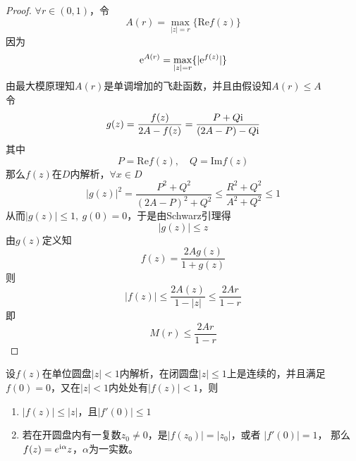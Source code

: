 \begin{proof}
    
    $\forall r \in (0,1)$，令
    $$A(r) = \max_{|z|=r}\{\mathrm{Re}f(z)\}$$
    因为
    $$\mathrm{e}^{A(r)} = \max_{|z|=r}\{|\mathrm{e}^{f(z)}|\}$$
    由最大模原理知$A(r)$是单调增加的飞赴函数，并且由假设知$A(r) \leq A$\\
    令
    $$ g(z) = \dfrac{f(z)}{2A - f(z)} = \dfrac{P + Q\mathrm{i}}{(2A-P)-Q\mathrm{i}} $$
    其中
    $$ P = \mathrm{Re}f(z),\quad Q = \mathrm{Im}f(z) $$
    那么$f(z)$在$D$内解析，$\forall x\in D$
    $$|g(z)|^2 = \dfrac{P^2 + Q^2}{(2A-P)^2 + Q^2} \leq \dfrac{R^2 + Q^2}{A^2 + Q^2} \leq 1$$
    从而$|g(z)| \leq 1,\ g(0) = 0$，于是由\textup{Schwarz}引理得
    $$|g(z) | \leq z$$
    由$g(z)$定义知
    $$f(z) = \dfrac{2Ag(z)}{1 + g(z)}$$
    则
    $$ |f(z)| \leq \dfrac{2A(z)}{1 - |z|} \leq \dfrac{2Ar}{1 - r}$$
    即
    $$M(r) \leq \dfrac{2Ar}{1 - r}$$

\end{proof}

\begin{lemma}[Schwarz引理]
    
    设$f(z)$在单位圆盘$|z|<1$内解析，在闭圆盘$|z| \leq 1$上是连续的，并且满足$f(0) = 0$，又在$|z| < 1$内处处有$|f(z)| < 1$，则

    \begin{enumerate}
        
        \item $|f(z)| \leq |z|$，且$|f'(0)| \leq 1$
            
        \item 
            若在开圆盘内有一复数$z_0 \neq 0$，是$|f(z_0)| = |z_0|$，或者 $|f'(0)| = 1$，
            那么$f(z) = e^{\mathrm{i}\alpha}z$，$\alpha$为一实数。
        
    \end{enumerate}

\end{lemma}

